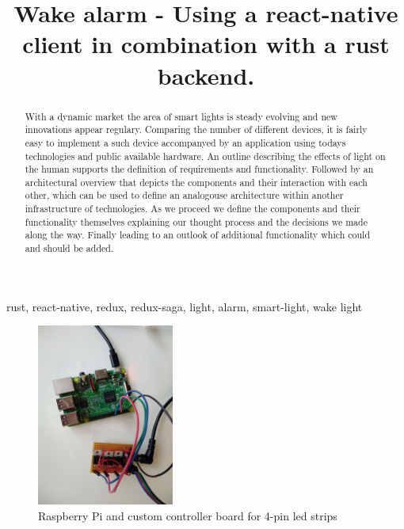 \documentclass[conference]{IEEEtran}
\begin{document}
\title{Wake alarm - Using a react-native client in combination with a rust backend.}

\author{
\and
{}
}

\maketitle

\begin{abstract}
With a dynamic market the area of smart lights is steady evolving and new innovations appear regulary. Comparing the number of
different devices, it is fairly easy to implement a such device accompanyed by an application using todays technologies
and public available hardware. An outline describing the effects of light on the human supports the definition of requirements
and functionality. Followed by an architectural overview that depicts the components and their interaction with each other, which
can be used to define an analogouse architecture within another infrastructure of technologies. As we proceed we define the
components and their functionality themselves explaining our thought process and the decisions we made along the way. 
Finally leading to an outlook of additional functionality which could and should be added.

\end{abstract}

\begin{IEEEkeywords}
rust, react-native, redux, redux-saga, light, alarm, smart-light, wake light
\end{IEEEkeywords}

\begin{figure}[H]
    \centering
    \includegraphics[width=0.4\textwidth]{board}
    \caption{Raspberry Pi and custom controller board for 4-pin led strips}
\end{figure}
\end{document}
